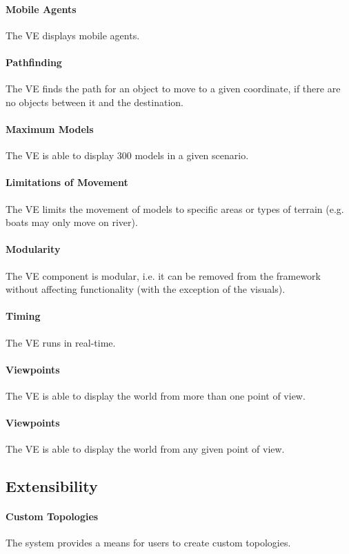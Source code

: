 \documentclass[titlepage]{article}
\begin{document}
    \paragraph{Mobile Agents} The VE displays mobile agents.
    \paragraph{Pathfinding} The VE finds the path for an object to move to a given coordinate, if there are no objects between it and the destination.
    \paragraph{Maximum Models} The VE is able to display 300 models in a given scenario.
    \paragraph{Limitations of Movement} The VE limits the movement of models to specific areas or types of terrain (e.g. boats may only move on river).
    \paragraph{Modularity} The VE component is modular, i.e. it can be removed from the framework without affecting functionality (with the exception of the visuals).
    \paragraph{Timing} The VE runs in real-time.
    \paragraph{Viewpoints} The VE is able to display the world from more than one point of view.
    \paragraph{Viewpoints} The VE is able to display the world from any given point of view.


\subsection{Extensibility%
  \label{extensibility}%
}
    \paragraph{Custom Topologies} The system provides a means for users to create custom topologies.
\end{document}
